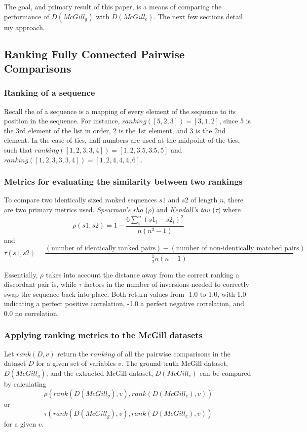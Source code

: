 The goal, and primary result of this paper, is a means of comparing the performance of $D({McGill}_{g})$ with $D({McGill}_{e})$. The next few sections detail my approach.

\subsection{Ranking Fully Connected Pairwise Comparisons}

\subsubsection{Ranking of a sequence}

Recall the  of a sequence is a mapping of every element of the sequence to its position in the sequence. For instance, $ranking([5,2,3]) = [3,1,2]$, since 5 is the 3rd element of the list in order, 2 is the 1st element, and 3 is the 2nd element. In the case of ties, half numbers are used at the midpoint of the ties, such that $ranking([1,2,3,3,4])=[1,2,3.5,3.5,5]$ and $ranking([1,2,3,3,3,4])=[1,2,4,4,4,6]$.

\subsubsection{Metrics for evaluating the similarity between two rankings}

To compare two identically sized ranked sequences $s1$ and $s2$ of length $n$, there are two primary metrics used. \textit{Spearman's rho}\cite{diaconis1977spearman} ($\rho$) and \textit{Kendall's tau} ($\tau$) where
\[ \rho(s1,s2) = {1 - \frac {6 \sum_i^n (s1_i - s2_i)^2}{n(n^2 - 1)}} \] and \[ \tau(s1,s2) = \frac{(\text{number of identically ranked pairs}) - (\text{number of non-identically matched pairs})}{\frac{1}{2} n (n-1)} \]

Essentially, $\rho$ takes into account the distance away from the correct ranking a discordant pair is, while $\tau$ factors in the number of inversions needed to correctly swap the sequence back into place. Both return values from -1.0 to 1.0, with 1.0 indicating a perfect positive correlation, -1.0 a perfect negative correlation, and 0.0 no correlation.

\subsubsection{Applying ranking metrics to the McGill datasets}

Let $rank(D,v)$ return the $ranking$ of all the pairwise comparisons in the dataset $D$ for a given set of variables $v$. The ground-truth McGill dataset, $D({McGill}_{g})$, and the extracted McGill dataset, $D({McGill}_{e})$ can be compared by calculating \[ \rho(rank(D({McGill}_{g}),v), rank(D({McGill}_{e}),v)) \] or \[ \tau(rank(D({McGill}_{g}),v), rank(D({McGill}_{e}),v)) \] for a given $v$.

